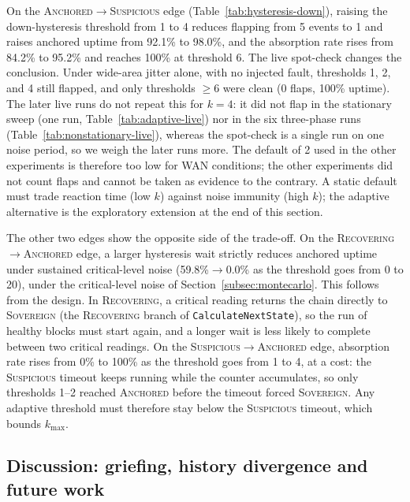 On the \textsc{Anchored}$\to$\textsc{Suspicious} edge
(Table~\ref{tab:hysteresis-down}), raising the down-hysteresis
threshold from 1 to 4 reduces flapping from 5 events to 1 and raises
anchored uptime from 92.1\% to 98.0\%, and the absorption rate rises from
84.2\% to 95.2\% and reaches 100\% at threshold 6. The live spot-check changes the conclusion. Under wide-area jitter alone,
with no injected fault, thresholds 1, 2, and 4 still flapped, and only
thresholds $\geq 6$ were clean (0 flaps, 100\% uptime). The later live runs do not
repeat this for $k{=}4$: it did not flap in the stationary sweep (one run,
Table~\ref{tab:adaptive-live}) nor in the six three-phase runs
(Table~\ref{tab:nonstationary-live}), whereas the spot-check is a single run on
one noise period, so we weigh the later runs more. The default of 2
used in the other experiments is therefore too low for WAN conditions; the
other experiments did not count flaps and cannot be taken as evidence to
the contrary. A static default must trade reaction time (low $k$) against
noise immunity (high $k$); the adaptive alternative is the exploratory extension
at the end of this section.

The other two edges show the opposite side of the trade-off. On the \textsc{Recovering}$\to$\textsc{Anchored} edge, a
larger hysteresis wait strictly reduces anchored uptime under sustained
critical-level noise (59.8\%$\to$0.0\% as the threshold goes from 0 to 20),
under the critical-level noise of Section~\ref{subsec:montecarlo}. This
follows from the design. In \textsc{Recovering}, a critical reading returns the
chain directly to \textsc{Sovereign} (the \textsc{Recovering} branch of
\texttt{CalculateNextState}), so the run of healthy blocks must start again,
and a longer wait is less likely to complete between two critical readings. On the \textsc{Suspicious}$\to$\textsc{Anchored} edge, absorption rate
rises from 0\% to 100\% as the threshold goes from 1 to 4, at a cost: the \textsc{Suspicious} timeout keeps running while the
counter accumulates, so only thresholds 1--2 reached \textsc{Anchored}
before the timeout forced \textsc{Sovereign}. Any adaptive threshold
must therefore stay below the \textsc{Suspicious} timeout, which bounds
$k_{\max}$. 


\subsection*{Discussion: griefing, history divergence and future work}

